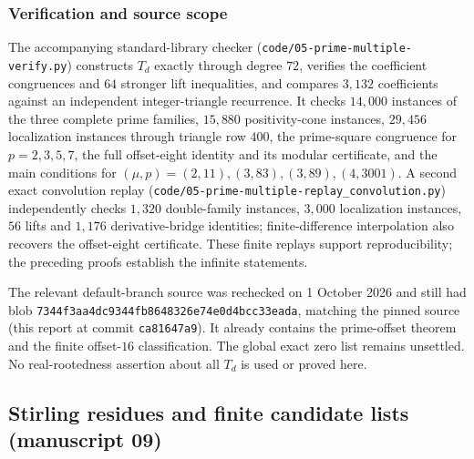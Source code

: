 \documentclass[11pt,a4paper]{article}
\numberwithin{equation}{section}
\theoremstyle{definition}
\theoremstyle{remark}
\theoremstyle{plain}
\begin{document}
\subsubsection{Verification and source scope}

The accompanying standard-library checker
(\texttt{code/05-prime-\allowbreak multiple-\allowbreak verify.py}) constructs
$T_d$ exactly through degree $72$, verifies the coefficient congruences and
$64$ stronger lift inequalities, and compares $3{,}132$ coefficients against an
independent integer-triangle recurrence. It checks $14{,}000$ instances of the
three complete prime families, $15{,}880$ positivity-cone instances, $29{,}456$
localization instances through triangle row $400$, the prime-square congruence
for $p=2,3,5,7$, the full offset-eight identity and its modular certificate,
and the main conditions for $(\mu,p)=(2,11),(3,83),(3,89),(4,3001)$. A second
exact convolution replay
(\texttt{code/05-prime-\allowbreak multiple-\allowbreak replay\_convolution.py})
independently checks $1{,}320$ double-family instances, $3{,}000$ localization
instances, $56$ lifts and $1{,}176$ derivative-bridge identities;
finite-difference interpolation also recovers the offset-eight certificate.
These finite replays support reproducibility; the preceding proofs establish
the infinite statements.

The relevant default-branch source was rechecked on 1 October 2026 and still
had blob \texttt{7344f3aa4dc9344fb8648326e74e0d4bcc33eada}, matching the pinned
source (this report at commit \texttt{ca81647a9}). It already contains the
prime-offset theorem and the finite offset-$16$ classification. The global
exact zero list remains unsettled. No real-rootedness assertion about all $T_d$
is used or proved here.

\subsection{Stirling residues and finite candidate lists (manuscript 09)}\label{xx:st:sec}
\end{document}
